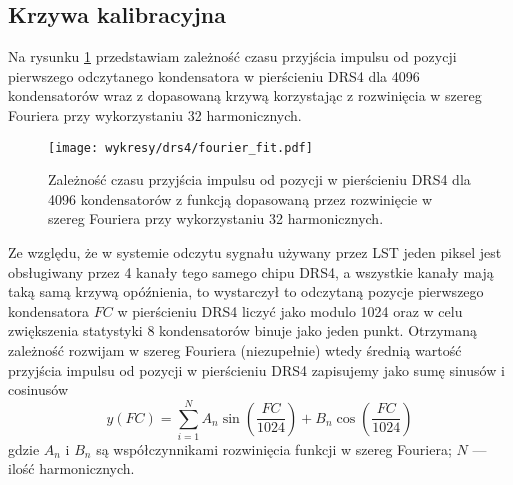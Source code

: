 \documentclass[a4paper,11pt,twoside]{article}
\begin{document}
\subsection{Krzywa kalibracyjna}
Na rysunku \ref{fig:fourier_fit_4096} przedstawiam zależność czasu przyjścia impulsu od pozycji pierwszego odczytanego kondensatora w pierścieniu DRS4 dla 4096 kondensatorów wraz z dopasowaną krzywą korzystając z rozwinięcia w szereg Fouriera przy wykorzystaniu 32 harmonicznych.
\begin{figure}[H] 
\centering
\texttt{[image: wykresy/drs4/fourier\_fit.pdf]}
\caption{Zależność czasu przyjścia impulsu od pozycji w pierścieniu DRS4 dla 4096 kondensatorów z funkcją dopasowaną przez rozwinięcie w szereg Fouriera przy wykorzystaniu 32 harmonicznych.}
\label{fig:fourier_fit_4096}
\end{figure}
Ze względu, że w systemie odczytu sygnału używany przez LST jeden piksel jest obsługiwany przez 4 kanały tego samego chipu DRS4, a wszystkie kanały mają taką samą krzywą opóźnienia, to wystarczył to odczytaną pozycje pierwszego kondensatora $FC$ w pierścieniu DRS4 liczyć jako modulo 1024 oraz w celu zwiększenia statystyki 8 kondensatorów binuje jako jeden punkt. 
\newpage
Otrzymaną zależność rozwijam w szereg Fouriera (niezupełnie) wtedy
średnią wartość przyjścia impulsu od pozycji w pierścieniu DRS4 zapisujemy jako sumę sinusów i cosinusów
\begin{equation}
y(FC) = \sum_{i=1}^{N} A_n \sin \left( \frac{FC}{1024} \right) + B_n \cos \left( \frac{FC}{1024} \right)
\end{equation}
gdzie $A_n$ i $B_n$ są współczynnikami rozwinięcia funkcji w szereg Fouriera; $N$ --- ilość harmonicznych.
\end{document}
